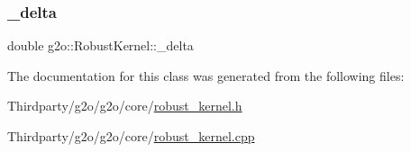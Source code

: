 \subsubsection{\texorpdfstring{\+\_\+delta}{\_delta}}
{\footnotesize\ttfamily double g2o\+::\+Robust\+Kernel\+::\+\_\+delta\hspace{0.3cm}{\ttfamily [protected]}}



The documentation for this class was generated from the following files\+:\begin{DoxyCompactItemize}
\item 
Thirdparty/g2o/g2o/core/\mbox{\hyperlink{robust__kernel_8h}{robust\+\_\+kernel.\+h}}\item 
Thirdparty/g2o/g2o/core/\mbox{\hyperlink{robust__kernel_8cpp}{robust\+\_\+kernel.\+cpp}}\end{DoxyCompactItemize}
